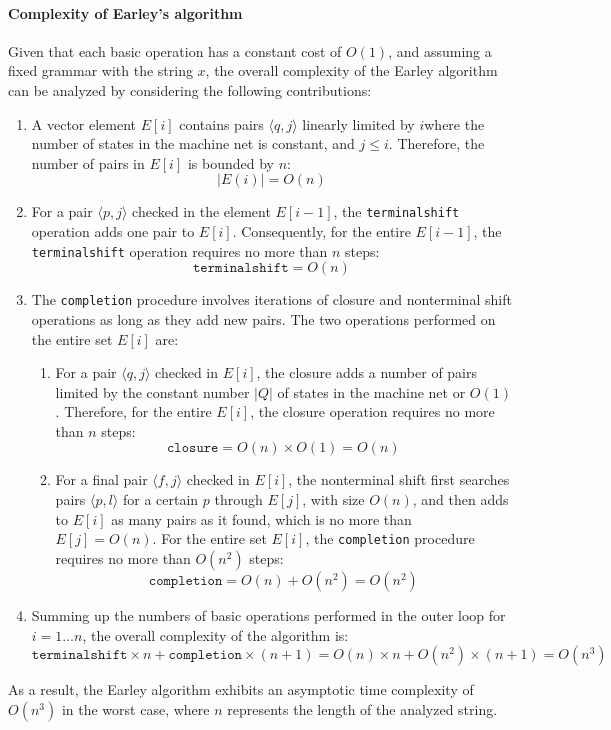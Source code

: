 \paragraph*{Complexity of Earley's algorithm}
Given that each basic operation has a constant cost of $O(1)$, and assuming a fixed grammar with the string $x$, the overall complexity of the Earley algorithm can be analyzed by considering the following contributions:
\begin{enumerate}
    \item A vector element $E[i]$ contains pairs $\langle q, j \rangle$ linearly limited by $i$where the number of states in the machine net is constant, and $j \leq i$.
        Therefore, the number of pairs in $E[i]$ is bounded by $n$:
        \[ |E(i)| = O(n) \]
    \item For a pair $\langle p, j \rangle$ checked in the element $E[i-1]$, the \texttt{terminalshift} operation adds one pair to $E[i]$.
        Consequently, for the entire $E[i-1]$, the \texttt{terminalshift} operation requires no more than $n$ steps:
        \[ \texttt{terminalshift} = O(n) \]
    \item The \texttt{completion} procedure involves iterations of closure and nonterminal shift operations as long as they add new pairs. 
        The two operations performed on the entire set $E[i]$ are:
        \begin{enumerate}
            \item For a pair $\langle q, j\rangle$ checked in $E[i]$, the closure adds a number of pairs limited by the constant number $|Q|$ of states in the machine net or $O(1)$. 
                Therefore, for the entire $E[i]$, the closure operation requires no more than $n$ steps:
                \[ \texttt{closure} = O(n) \times O(1) = O(n) \]
            \item For a final pair $\langle f, j \rangle$ checked in $E[i]$, the nonterminal shift first searches pairs $\langle p, l \rangle$ for a certain $p$ through $E[j]$, with size $O(n)$, and then adds to $E[i]$ as many pairs as it found, which is no more than $E[j] = O(n)$. For the entire set $E[i]$, the \texttt{completion} procedure requires no more than $O(n^2)$ steps:
                \[ \texttt{completion} = O(n) + O(n^2) = O(n^2) \]
        \end{enumerate}
    \item Summing up the numbers of basic operations performed in the outer loop for $i = 1 \dots n$, the overall complexity of the algorithm is:
        \[ \texttt{terminalshift} \times n + \texttt{completion} \times (n+1) = O(n) \times n + O(n^2) \times (n + 1) = O(n^3) \]
\end{enumerate}
As a result, the Earley algorithm exhibits an asymptotic time complexity of $O(n^3)$ in the worst case, where $n$ represents the length of the analyzed string.


